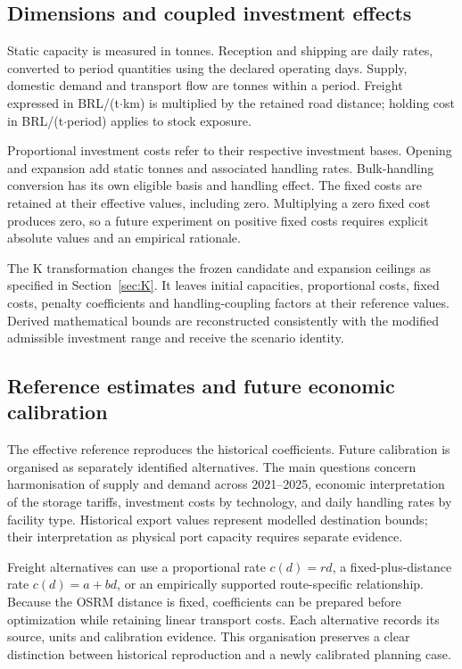 \documentclass[11pt,a4paper]{article}
\begin{document}
\subsection{Dimensions and coupled investment effects}

Static capacity is measured in tonnes. Reception and shipping are daily rates, converted to period quantities using the declared operating days. Supply, domestic demand and transport flow are tonnes within a period. Freight expressed in BRL/(t$\cdot$km) is multiplied by the retained road distance; holding cost in BRL/(t$\cdot$period) applies to stock exposure.

Proportional investment costs refer to their respective investment bases. Opening and expansion add static tonnes and associated handling rates. Bulk-handling conversion has its own eligible basis and handling effect. The fixed costs are retained at their effective values, including zero. Multiplying a zero fixed cost produces zero, so a future experiment on positive fixed costs requires explicit absolute values and an empirical rationale.

The K transformation changes the frozen candidate and expansion ceilings as specified in Section~\ref{sec:K}. It leaves initial capacities, proportional costs, fixed costs, penalty coefficients and handling-coupling factors at their reference values. Derived mathematical bounds are reconstructed consistently with the modified admissible investment range and receive the scenario identity.

\subsection{Reference estimates and future economic calibration}

The effective reference reproduces the historical coefficients. Future calibration is organised as separately identified alternatives. The main questions concern harmonisation of supply and demand across 2021--2025, economic interpretation of the storage tariffs, investment costs by technology, and daily handling rates by facility type. Historical export values represent modelled destination bounds; their interpretation as physical port capacity requires separate evidence.

Freight alternatives can use a proportional rate $c(d)=rd$, a fixed-plus-distance rate $c(d)=a+bd$, or an empirically supported route-specific relationship. Because the OSRM distance is fixed, coefficients can be prepared before optimization while retaining linear transport costs. Each alternative records its source, units and calibration evidence. This organisation preserves a clear distinction between historical reproduction and a newly calibrated planning case.
\end{document}
